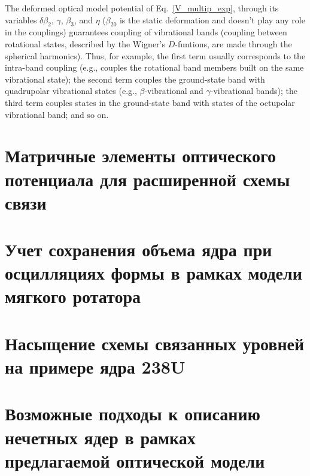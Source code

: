 The deformed optical model potential of Eq.~\eqref{V_multip_exp}, through
its variables $\delta \beta _{2}$, $\gamma $, $\beta _{3}$, and $\eta$
($\beta _{20}$ is the static deformation and doesn't play any role in the
couplings) guarantees coupling of vibrational bands (coupling between
rotational states, described by the Wigner's $D$-funtions, are made
through the spherical harmonics). Thus, for example, the first term usually corresponds
to the intra-band coupling (e.g., couples the rotational band members built
on the same vibrational state); the second term couples the ground-state band with quadrupolar vibrational
states (e.g., $\beta $-vibrational and $\gamma $-vibrational bands); the third term couples states
in the ground-state band with states of the octupolar vibrational band;  and so on.


\section{Матричные элементы оптического потенциала для расширенной схемы связи}

\section{Учет сохранения объема ядра при осцилляциях формы в рамках модели
мягкого ротатора}

\section{Насыщение схемы связанных уровней на примере ядра 238U}

\section{Возможные подходы к описанию нечетных ядер в рамках предлагаемой 
оптической модели}
